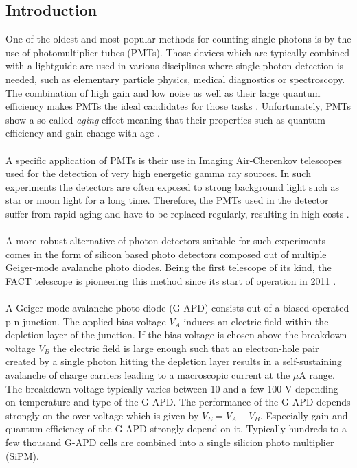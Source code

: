 \documentclass[10pt,a4paper]{article}
\begin{document}
\begin{multicols}{2}
\section{Introduction}
One of the oldest and most popular methods for counting single photons is by the use of photomultiplier tubes (PMTs). Those devices which are typically combined with a lightguide are used in various disciplines where single photon detection is needed, such as elementary particle physics, medical diagnostics or spectroscopy. The combination of high gain and low noise as well as their large quantum efficiency makes PMTs the ideal candidates for those tasks \cite{Hama}. Unfortunately, PMTs show a so called \emph{aging} effect meaning that their properties such as quantum efficiency and gain change with age \cite{aging}. \\ \\ \noindent
A specific application of PMTs is their use in Imaging Air-Cherenkov telescopes used for the detection of very high energetic gamma ray sources. In such experiments the detectors are often exposed to strong background light such as star or moon light for a long time. Therefore, the PMTs used in the detector suffer from rapid aging and have to be replaced regularly, resulting in high costs \cite{gapd}. \\ \\ \noindent
A more robust alternative of photon detectors suitable for such experiments comes in the form of silicon based photo detectors composed out of multiple Geiger-mode avalanche photo diodes. Being the first telescope of its kind, the FACT telescope is pioneering this method since  its start of operation in 2011 \cite{fact}. \\ \\\noindent
A Geiger-mode avalanche photo diode (G-APD) consists out of a biased operated p-n junction. The applied bias voltage $V_A$ induces an electric field within the depletion layer of the junction. If the bias voltage is chosen above the breakdown voltage $V_B$ the electric field is large enough such that an electron-hole pair created by a single photon hitting the depletion layer results in a self-sustaining avalanche of charge carriers leading to a macroscopic current at the $\mu$A range. The breakdown voltage typically varies between 10 and a few 100 V depending on temperature and type of the G-APD. The performance of the G-APD depends strongly on the over voltage which is given by $V_E = V_A - V_B$. Especially gain and quantum efficiency of the G-APD strongly depend on it. Typically hundreds to a few thousand G-APD cells are combined into a single silicion photo multiplier (SiPM). \\ \\  \noindent

\end{multicols}
\end{document}
